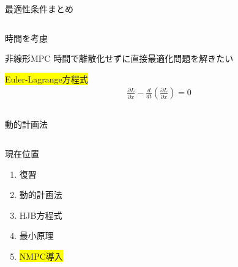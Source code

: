 \documentclass[twocolumn, dvipdfmx,12pt]{beamer}
\begin{document}
\begin{frame}{最適性条件まとめ}
\begin{columns}
            \begin{column}{.55\textwidth}
                \begin{itembox}[l]{時間を考慮}
                    \begin{itembox}[l]{非線形MPC}
                        時間で離散化せずに直接最適化問題を解きたい
                    \end{itembox}
                    \colorbox{yellow}{Euler-Lagrange方程式}\\
                    \begin{align*}
                        \frac{\partial L}{\partial x} - \frac{d}{dt} \left( \frac{\partial L}{\partial \dot{x}} \right) = 0
                    \end{align*}
                    \begin{columns}
                        \begin{column}{.5\textwidth}
                            \begin{center}
                                \begin{itembox}[l]{動的計画法}
                                \end{itembox}
                            \end{center}
                        \end{column}
                        \begin{column}{.5\textwidth}
                        \end{column}
                    \end{columns}
                    
                \end{itembox}
            \end{column}
        \end{columns}
    \end{frame}

    \begin{frame}{現在位置}
        \footnotesize
        \begin{enumerate}
            \item 復習
            \item 動的計画法
            \item HJB方程式
            \item 最小原理
            \item \colorbox{yellow}{NMPC導入}
        \end{enumerate}
    \end{frame}
\end{document}
